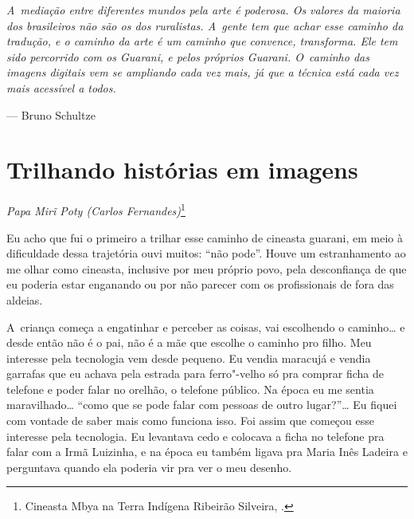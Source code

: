 \clearpage

\vspace*{\fill}

\begin{flushright}
\begin{minipage}[c]{0.85\textwidth}
\raggedleft
\footnotesize
\emph{A~mediação entre diferentes mundos pela arte é poderosa. Os valores da
maioria dos brasileiros não são os dos ruralistas. A~gente tem que
achar esse caminho da tradução, e o caminho da arte é um caminho que
convence, transforma. Ele tem sido percorrido com os Guarani, e pelos
próprios Guarani. O~caminho das imagens digitais vem se ampliando cada
vez mais, já que a técnica está cada vez mais acessível a todos.}

\smallskip
\hspace*{\fill}--- Bruno Schultze
\end{minipage}
\end{flushright}

\thispagestyle{empty}

\chapter*{Trilhando histórias em imagens}


\begin{flushright}
\emph{Papa Mirĩ Poty (Carlos Fernandes)}\footnote{Cineasta Mbya
na Terra Indígena Ribeirão Silveira, .}
\end{flushright}
\medskip

\noindent Eu acho que fui o primeiro a trilhar esse caminho de cineasta guarani,
em meio à dificuldade dessa trajetória ouvi muitos: ``não pode''. Houve
um estranhamento ao me olhar como cineasta, inclusive por meu próprio
povo, pela desconfiança de que eu poderia estar enganando ou por não
parecer com os profissionais de fora das aldeias.

A~criança começa a engatinhar e perceber as coisas, vai escolhendo o
caminho\ldots{} e desde então não é o pai, não é a mãe que escolhe o caminho
pro filho. Meu interesse pela tecnologia vem desde pequeno. Eu vendia
maracujá e vendia garrafas que eu achava pela estrada para ferro"-velho
só pra comprar ficha de telefone e poder falar no orelhão, o telefone
público. Na época eu me sentia maravilhado\ldots{} ``como que se pode falar
com pessoas de outro lugar?''\ldots{} Eu fiquei com vontade de saber mais
como funciona isso. Foi assim que começou esse interesse pela
tecnologia. Eu levantava cedo e colocava a ficha no telefone pra falar
com a Irmã Luizinha, e na época eu também ligava pra Maria Inês Ladeira
e perguntava quando ela poderia vir pra ver o meu desenho. 

